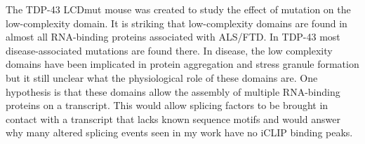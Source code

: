 The TDP-43 LCDmut mouse was created to study the effect of mutation on the low-complexity domain. 
It is striking that low-complexity domains are found in almost all RNA-binding proteins associated with ALS/FTD.
In TDP-43 most disease-associated mutations are found there.
In disease, the low complexity domains have been implicated in protein aggregation and stress granule formation but it still unclear what the physiological role of these domains are.
One hypothesis is that these domains allow the assembly of multiple RNA-binding proteins on a transcript. 
This would allow splicing factors to be brought in contact with a transcript that lacks known sequence motifs and would answer why many altered splicing events seen in my work have no iCLIP binding peaks.














